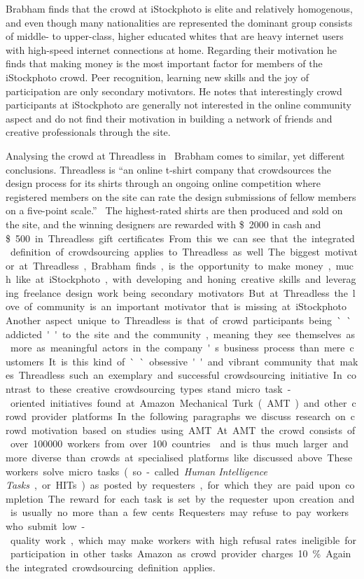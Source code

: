 \documentclass{sig-alternate}
\begin{document}
Brabham finds that the crowd at iStockphoto is elite and relatively homogenous,
and even though many nationalities are represented the dominant group consists
of middle- to upper-class, higher educated whites that are heavy internet users
with high-speed internet connections at home. Regarding their motivation he
finds that making money is the most important factor for members of the
iStockphoto crowd. Peer recognition, learning new skills and the joy of
participation are only secondary motivators. He notes that interestingly crowd
participants at iStockphoto are generally not interested in the online
community aspect and do not find their motivation in building a network of
friends and creative professionals through the site.

Analysing the crowd at Threadless in~\cite{brabham2010moving} Brabham comes to
similar, yet different conclusions. Threadless is ``an online t-shirt company
that crowdsources the design process for its shirts through an ongoing online
competition where registered members on the site can rate the design
submissions of fellow members on a five-point scale.''~\cite{brabham2010moving}
The highest-rated shirts are then produced and sold on the site, and the
winning designers are rewarded with \SI{2000}[\$]{} in cash and \SI{500}[\$] in
Threadless gift certificates. From this we can see that the integrated
definition of crowdsourcing applies to Threadless as well.

The biggest motivator at Threadless, Brabham finds, is the opportunity to make
money, much like at iStockphoto, with developing and honing creative skills and
leveraging freelance design work being secondary motivators. But at Threadless
the love of community is an important motivator that is missing at iStockphoto.
Another aspect unique to Threadless is that of crowd participants being
``addicted'' to the site and the community, meaning they see themselves as more
as meaningful actors in the company's business process than mere customers. It
is this kind of ``obsessive'' and vibrant community that makes Threadless such
an exemplary and successful crowdsourcing initiative.

In contrast to these creative crowdsourcing types stand micro task-oriented
initiatives found at Amazon Mechanical Turk (AMT) and other crowd provider
platforms. In the following paragraphs we discuss research on crowd motivation
based on studies using AMT.

At AMT the crowd consists of over \num{100000} workers from over \num{100}
countries~\cite{buhrmester2011amazon} and is thus much larger and more diverse
than crowds at specialised platforms like discussed above. These workers solve
micro tasks (so-called \emph{Human Intelligence Tasks}, or HITs) as posted by
requesters, for which they are paid upon completion.  The reward for each task
is set by the requester upon creation and is usually no more than a few cents.
Requesters may refuse to pay workers who submit low-quality work, which may
make workers with high refusal rates ineligible for participation in other
tasks. Amazon as crowd provider charges \num{10}\percent. Again the integrated
crowdsourcing definition applies.
\end{document}
